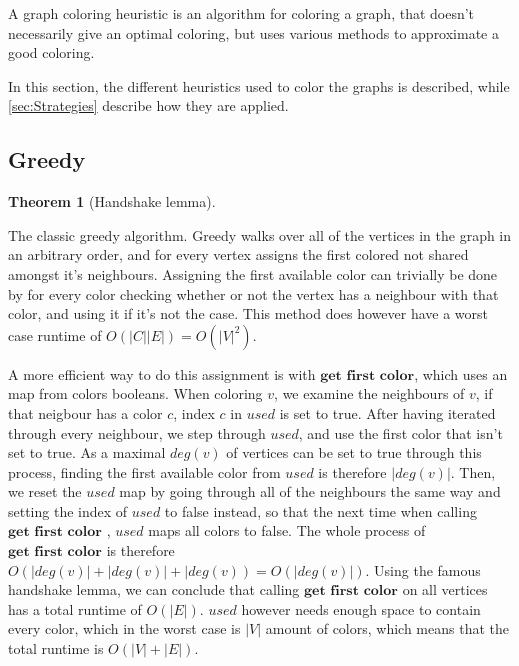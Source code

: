 \documentclass[a4paper]{article}
\newtheorem{theorem}{Theorem}[section]
\begin{document}
A graph coloring heuristic is an algorithm for coloring a graph, that doesn't
necessarily give an optimal coloring, but uses various methods to approximate a
good coloring.


In this section, the different heuristics used to color the graphs is described,
while \autoref{sec:Strategies} describe how they are applied.
\subsection{Greedy}

\begin{theorem}[Handshake lemma]{}

\end{theorem}

The classic greedy algorithm. Greedy walks over all of the vertices in the graph
in an arbitrary order, and for every vertex assigns the first colored not shared
amongst it's neighbours. Assigning the first available color can trivially be done
by for every color checking whether or not the vertex has a neighbour with that color,
and using it if it's not the case. This method does however
have a worst case runtime of $O(|C||E|) = O(|V|^2)$. 

A more efficient way to do this assignment is with $\textbf{get first color}$,
which uses an map from colors booleans. When coloring $v$, we examine the
neighbours of $v$, if that neigbour has a color $c$, index $c$ in $used$ is set
to true. After having iterated through every neighbour, we step through $used$,
and use the first color that isn't set to true. As a maximal $deg(v)$ of
vertices can be set to true through this process, finding the first available
color from $used$ is therefore $|deg(v)|$. Then, we reset the $used$ map by
going through all of the neighbours the same way and setting the index of
$used$ to false instead, so that the next time when calling $\textbf{get first color}$ ,
$used$ maps all colors to false. The whole process of $\textbf{get first
color}$ is therefore $O(|deg(v)|+|deg(v)| + |deg(v)) = O(|deg(v)|)$. Using the
famous handshake lemma, we can conclude that calling $\textbf{get first color}$
on all vertices has a total runtime of $O(|E|)$.  $used$ however needs enough
space to contain every color, which in the worst case is $|V|$ amount of
colors, which means that the total runtime is $O(|V|+|E|)$.

\end{document}
